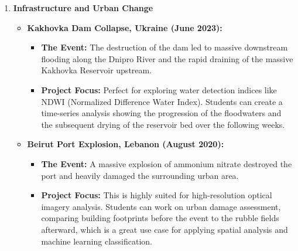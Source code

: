\documentclass{article}
\begin{document}
\begin{enumerate}
    \item \textbf{Infrastructure and Urban Change}
    \begin{itemize}
        \item \textbf{Kakhovka Dam Collapse, Ukraine (June 2023):}
        \begin{itemize}
            \item \textbf{The Event:} The destruction of the dam led to massive downstream flooding along the Dnipro River and the rapid draining of the massive Kakhovka Reservoir upstream.
            \item \textbf{Project Focus:} Perfect for exploring water detection indices like NDWI (Normalized Difference Water Index). Students can create a time-series analysis showing the progression of the floodwaters and the subsequent drying of the reservoir bed over the following weeks.
        \end{itemize}
        \item \textbf{Beirut Port Explosion, Lebanon (August 2020):}
        \begin{itemize}
            \item \textbf{The Event:} A massive explosion of ammonium nitrate destroyed the port and heavily damaged the surrounding urban area.
            \item \textbf{Project Focus:} This is highly suited for high-resolution optical imagery analysis. Students can work on urban damage assessment, comparing building footprints before the event to the rubble fields afterward, which is a great use case for applying spatial analysis and machine learning classification.
        \end{itemize}
    \end{itemize}


\end{enumerate}
\end{document}
